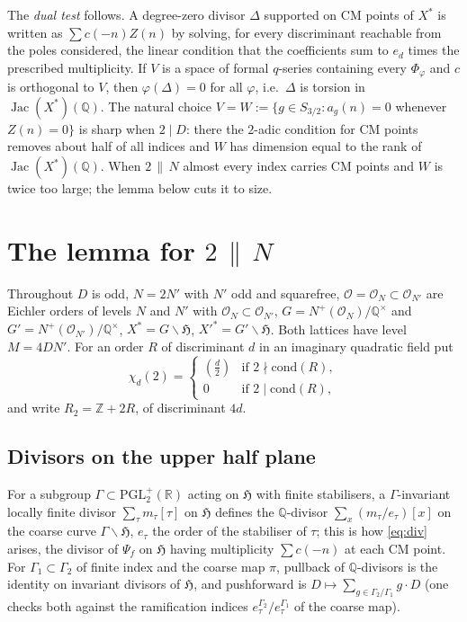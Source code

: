 \documentclass[11pt,reqno]{amsart}
\theoremstyle{plain}
\theoremstyle{definition}
\DeclareMathOperator{\Jac}{Jac}
\newcommand{\Q}{\mathbb{Q}}
\newcommand{\Z}{\mathbb{Z}}
\newcommand{\HH}{\mathfrak{H}}
\newcommand{\cO}{\mathcal{O}}
\begin{document}
The \emph{dual test} follows. A degree-zero divisor $\Delta$ supported on CM points of $X^*$ is
written as $\sum c(-n)Z(n)$ by solving, for every discriminant reachable from the poles considered,
the linear condition that the coefficients sum to $e_d$ times the prescribed multiplicity. If $V$ is a
space of formal $q$-series containing every $\Phi_\varphi$ and $c$ is orthogonal to $V$, then
$\varphi(\Delta)=0$ for all $\varphi$, i.e.\ $\Delta$ is torsion in $\Jac(X^*)(\Q)$. The natural
choice $V=W:=\{g\in S_{3/2}:a_g(n)=0$ whenever $Z(n)=0\}$ is sharp when $2\mid D$: there the
$2$-adic condition for CM points removes about half of all indices and $W$ has dimension equal to
the rank of $\Jac(X^*)(\Q)$. When $2\,\|\,N$ almost every index carries CM points and $W$ is twice
too large; the lemma below cuts it to size.

\section{The lemma for $2\,\|\,N$}\label{sec:lemma}

Throughout $D$ is odd, $N=2N'$ with $N'$ odd and squarefree, $\cO=\cO_N\subset\cO_{N'}$ are Eichler
orders of levels $N$ and $N'$ with $\cO_N\subset\cO_{N'}$, $G=N^+(\cO_N)/\Q^\times$ and
$G'=N^+(\cO_{N'})/\Q^\times$, $X^*=G\backslash\HH$, $X'^*=G'\backslash\HH$. Both lattices have level
$M=4DN'$. For an order $R$ of discriminant $d$ in an imaginary quadratic field put
\[
\chi_d(2)=\begin{cases}\left(\tfrac d2\right)&\text{if }2\nmid\text{cond}(R),\\ 0&\text{if }2\mid\text{cond}(R),\end{cases}
\]
and write $R_2=\Z+2R$, of discriminant $4d$.

\subsection{Divisors on the upper half plane}
For a subgroup $\Gamma\subset\mathrm{PGL}_2^+(\mathbb{R})$ acting on $\HH$ with finite stabilisers,
a $\Gamma$-invariant locally finite divisor $\sum_\tau m_\tau[\tau]$ on $\HH$ defines the
$\Q$-divisor $\sum_{x}(m_\tau/e_\tau)[x]$ on the coarse curve $\Gamma\backslash\HH$, $e_\tau$ the
order of the stabiliser of $\tau$; this is how \eqref{eq:div} arises, the divisor of $\Psi_f$ on
$\HH$ having multiplicity $\sum c(-n)$ at each CM point. For $\Gamma_1\subset\Gamma_2$ of finite
index and the coarse map $\pi$, pullback of $\Q$-divisors is the identity on invariant divisors of
$\HH$, and pushforward is $D\mapsto\sum_{g\in\Gamma_2/\Gamma_1}g\cdot D$ (one checks both against
the ramification indices $e^{\Gamma_2}_\tau/e^{\Gamma_1}_\tau$ of the coarse map).
\end{document}
